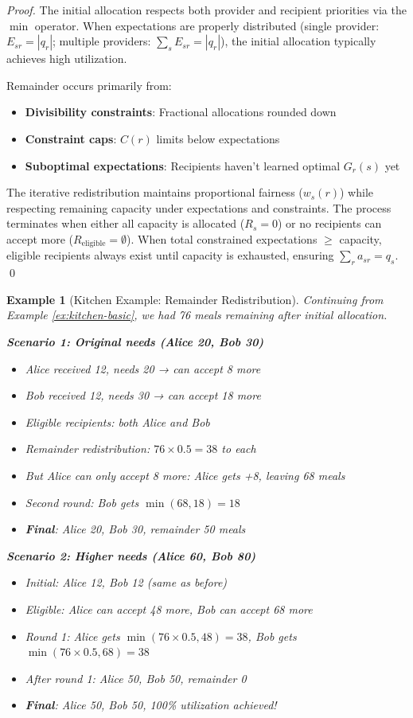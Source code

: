\documentclass[11pt]{article}
\newtheorem{example}{Example}
\begin{document}
\begin{proof}
The initial allocation respects both provider and recipient priorities via the $\min$ operator. When expectations are properly distributed (single provider: $E_{sr} = |q_r|$; multiple providers: $\sum_s E_{sr} = |q_r|$), the initial allocation typically achieves high utilization.

Remainder occurs primarily from:
\begin{itemize}
\item \textbf{Divisibility constraints}: Fractional allocations rounded down
\item \textbf{Constraint caps}: $C(r)$ limits below expectations
\item \textbf{Suboptimal expectations}: Recipients haven't learned optimal $G_r(s)$ yet
\end{itemize}

The iterative redistribution maintains proportional fairness ($w_s(r)$) while respecting remaining capacity under expectations and constraints. The process terminates when either all capacity is allocated ($R_s = 0$) or no recipients can accept more ($R_{\text{eligible}} = \emptyset$). When total constrained expectations $\geq$ capacity, eligible recipients always exist until capacity is exhausted, ensuring $\sum_r a_{sr} = q_s$. \qed
\end{proof}

\begin{example}[Kitchen Example: Remainder Redistribution]
\label{ex:kitchen-remainder}
Continuing from Example \ref{ex:kitchen-basic}, we had 76 meals remaining after initial allocation.

\textbf{Scenario 1: Original needs (Alice 20, Bob 30)}
\begin{itemize}
\item Alice received 12, needs 20 → can accept 8 more
\item Bob received 12, needs 30 → can accept 18 more
\item Eligible recipients: both Alice and Bob
\item Remainder redistribution: $76 \times 0.5 = 38$ to each
\item But Alice can only accept 8 more: Alice gets +8, leaving 68 meals
\item Second round: Bob gets $\min(68, 18) = 18$
\item \textbf{Final}: Alice 20, Bob 30, remainder 50 meals
\end{itemize}

\textbf{Scenario 2: Higher needs (Alice 60, Bob 80)}
\begin{itemize}
\item Initial: Alice 12, Bob 12 (same as before)
\item Eligible: Alice can accept 48 more, Bob can accept 68 more
\item Round 1: Alice gets $\min(76 \times 0.5, 48) = 38$, Bob gets $\min(76 \times 0.5, 68) = 38$
\item After round 1: Alice 50, Bob 50, remainder 0
\item \textbf{Final}: Alice 50, Bob 50, 100\% utilization achieved!
\end{itemize}
\end{example}
\end{document}
